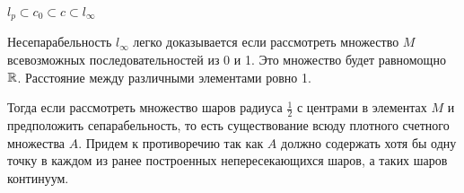 \begin{note}
$l_p \subset c_0 \subset c \subset l_{\infty}$
\end{note}

\begin{note}
Несепарабельность $l_\infty$ легко доказывается если рассмотреть множество $M$ всевозможных последовательностей из 0 и 1. Это множество будет равномощно $\mathbb{R}$. Расстояние между различными элементами ровно 1. 

Тогда если рассмотреть множество шаров радиуса $\frac{1}{2}$ с центрами в элементах $M$ и предположить сепарабельность, то есть существование всюду плотного счетного множества $A$. Придем к противоречию так как $A$ должно содержать хотя бы одну точку в каждом из ранее построенных непересекающихся шаров, а таких шаров континуум.
\end{note}
